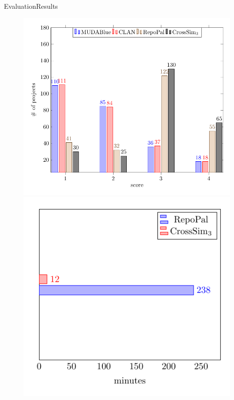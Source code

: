 \documentclass{beamer}
\begin{document}
\begin{frame}{Evaluation}{Results}
\begin{figure}[!tbp]
  \centering
  \begin{minipage}[b]{0.45\textwidth}
    \includegraphics[width=\textwidth]{images/Confidence.pdf}
  \end{minipage}
  \hfill
  \begin{minipage}[b]{0.40\textwidth}
    \includegraphics[width=\textwidth]{images/ExecutionTime.pdf}
  \end{minipage}
\end{figure}
\end{frame}
\end{document}
